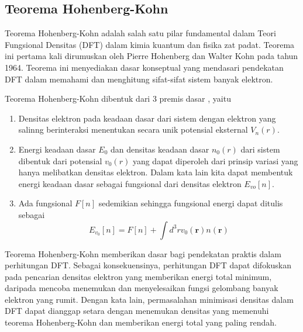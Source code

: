 \subsection{Teorema Hohenberg-Kohn}
Teorema Hohenberg-Kohn \citep{hohenberg1964inhomogeneous} adalah salah satu pilar fundamental dalam Teori Fungsional Densitas (DFT) dalam kimia kuantum dan fisika zat padat. Teorema ini pertama kali dirumuskan oleh Pierre Hohenberg dan Walter Kohn pada tahun 1964. Teorema ini menyediakan dasar konseptual yang mendasari pendekatan DFT dalam memahami dan menghitung sifat-sifat sistem banyak elektron.

Teorema Hohenberg-Kohn dibentuk dari 3 premis dasar \citep{Kurth_2005}, yaitu
\begin{enumerate}
    \item Densitas elektron pada keadaan dasar dari sistem dengan elektron yang salinng berinteraksi menentukan secara unik potensial eksternal $V_n(r)$.
    \item Energi keadaan dasar $E_0$ dan densitas keadaan dasar $n_0(r)$ dari sistem dibentuk dari potensial $v_0(r)$ yang dapat diperoleh dari prinsip variasi yang hanya melibatkan densitas elektron. Dalam kata lain kita dapat membentuk energi keadaan dasar sebagai fungsional dari densitas elektron $E_{vo}[n]$.
    \item Ada fungsional $F[n]$ sedemikian sehingga fungsional energi dapat ditulis sebagai
    \begin{equation}
        E_{v_0}[n]=F[n]+\int d^3rv_0(\mathbf{r})n(\mathbf{r})
    \end{equation}
\end{enumerate}
Teorema Hohenberg-Kohn memberikan dasar bagi pendekatan praktis dalam perhitungan DFT. Sebagai konsekuensinya, perhitungan DFT dapat difokuskan pada pencarian densitas elektron yang memberikan energi total minimum, daripada mencoba menemukan dan menyelesaikan fungsi gelombang banyak elektron yang rumit. Dengan kata lain, permasalahan minimisasi densitas dalam DFT dapat dianggap setara dengan menemukan densitas yang memenuhi teorema Hohenberg-Kohn dan memberikan energi total yang paling rendah.

